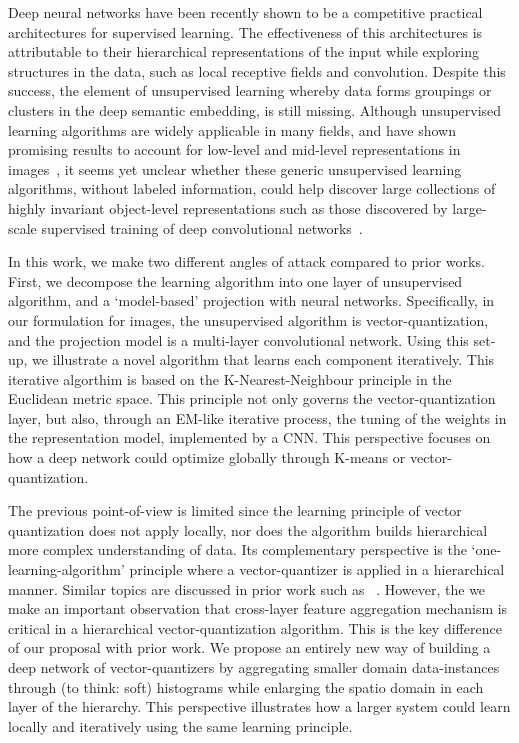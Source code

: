 \documentclass{article}
\begin{document}
Deep neural networks have been recently shown to be a competitive
practical architectures for supervised learning. The effectiveness of
this architectures is attributable to their hierarchical representations 
of the input while exploring structures in the data, such as local receptive 
fields and convolution. Despite this success, the element of 
unsupervised learning whereby data forms groupings or clusters in 
the deep semantic embedding, is still missing. Although unsupervised 
learning algorithms are widely applicable in many fields,
and have shown promising results to account for low-level and
mid-level representations in images~\cite{coates2011analysis,
 coates2012emergence, Le12}, it seems yet unclear whether these
generic unsupervised learning algorithms, without labeled information,
could help discover large collections of highly invariant object-level
representations such as those discovered by large-scale supervised
training of deep convolutional networks~\cite{Krizhevsky12}. 

In this work, we make two different angles of attack compared to prior
works. First, we decompose the learning algorithm
into one layer of unsupervised algorithm, and a `model-based'
projection with neural networks. Specifically, in our formulation for
images, the unsupervised algorithm is vector-quantization, and the
projection model is a multi-layer convolutional network. Using this
set-up, we illustrate a novel algorithm that learns each component
iteratively. This iterative algorthim is based on the
K-Nearest-Neighbour principle in the Euclidean metric space. This
principle not only governs the vector-quantization layer, but also,
through an EM-like iterative process, the tuning of the weights in the
representation model, implemented by a CNN. This perspective 
focuses on how a deep network could optimize globally through 
K-means or vector-quantization. 

The previous point-of-view is limited since the learning principle of 
vector quantization does not apply locally, nor does the algorithm 
builds hierarchical more complex understanding of data. Its complementary 
perspective is the `one-learning-algorithm' principle where a vector-quantizer 
is applied in a hierarchical manner. Similar topics are discussed 
in prior work such as ~\cite{coates2011analysis, coates2012emergence}. 
However, the we make an important observation that cross-layer feature 
aggregation mechanism is critical in a hierarchical vector-quantization algorithm. 
This is the key difference of our proposal with prior work. We propose an entirely 
new way of building a deep network of vector-quantizers 
by aggregating smaller domain data-instances through (to think: soft) histograms 
while enlarging the spatio domain in each layer of the hierarchy. This perspective 
illustrates how a larger system could learn locally and iteratively using the 
same learning principle. 
\end{document}
